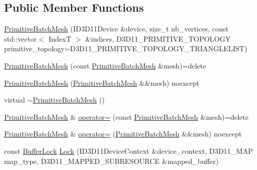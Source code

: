 \subsection*{Public Member Functions}
\begin{DoxyCompactItemize}
\item 
\mbox{\hyperlink{classmage_1_1rendering_1_1_primitive_batch_mesh_aa01b243a0ccb0ed4835c4dcab994d030}{Primitive\+Batch\+Mesh}} (I\+D3\+D11\+Device \&device, size\+\_\+t nb\+\_\+vertices, const std\+::vector$<$ IndexT $>$ \&indices, D3\+D11\+\_\+\+P\+R\+I\+M\+I\+T\+I\+V\+E\+\_\+\+T\+O\+P\+O\+L\+O\+GY primitive\+\_\+topology=D3\+D11\+\_\+\+P\+R\+I\+M\+I\+T\+I\+V\+E\+\_\+\+T\+O\+P\+O\+L\+O\+G\+Y\+\_\+\+T\+R\+I\+A\+N\+G\+L\+E\+L\+I\+ST)
\item 
\mbox{\hyperlink{classmage_1_1rendering_1_1_primitive_batch_mesh_a9f20b29914746fbb29b8c5146f7f63a2}{Primitive\+Batch\+Mesh}} (const \mbox{\hyperlink{classmage_1_1rendering_1_1_primitive_batch_mesh}{Primitive\+Batch\+Mesh}} \&mesh)=delete
\item 
\mbox{\hyperlink{classmage_1_1rendering_1_1_primitive_batch_mesh_ac46a8538b295cf4d85c7309d2bb4cdd5}{Primitive\+Batch\+Mesh}} (\mbox{\hyperlink{classmage_1_1rendering_1_1_primitive_batch_mesh}{Primitive\+Batch\+Mesh}} \&\&mesh) noexcept
\item 
virtual \mbox{\hyperlink{classmage_1_1rendering_1_1_primitive_batch_mesh_a96bb7d8ce20047163ec851b426087c80}{$\sim$\+Primitive\+Batch\+Mesh}} ()
\item 
\mbox{\hyperlink{classmage_1_1rendering_1_1_primitive_batch_mesh}{Primitive\+Batch\+Mesh}} \& \mbox{\hyperlink{classmage_1_1rendering_1_1_primitive_batch_mesh_a64b661150ec319d4dab092d44315bb67}{operator=}} (const \mbox{\hyperlink{classmage_1_1rendering_1_1_primitive_batch_mesh}{Primitive\+Batch\+Mesh}} \&mesh)=delete
\item 
\mbox{\hyperlink{classmage_1_1rendering_1_1_primitive_batch_mesh}{Primitive\+Batch\+Mesh}} \& \mbox{\hyperlink{classmage_1_1rendering_1_1_primitive_batch_mesh_a36409f6de1208f30069309675b19feb2}{operator=}} (\mbox{\hyperlink{classmage_1_1rendering_1_1_primitive_batch_mesh}{Primitive\+Batch\+Mesh}} \&\&mesh) noexcept
\item 
const \mbox{\hyperlink{classmage_1_1rendering_1_1_buffer_lock}{Buffer\+Lock}} \mbox{\hyperlink{classmage_1_1rendering_1_1_primitive_batch_mesh_afce7767a0e3496477c14f145c3c2bfe7}{Lock}} (I\+D3\+D11\+Device\+Context \&device\+\_\+context, D3\+D11\+\_\+\+M\+AP map\+\_\+type, D3\+D11\+\_\+\+M\+A\+P\+P\+E\+D\+\_\+\+S\+U\+B\+R\+E\+S\+O\+U\+R\+CE \&mapped\+\_\+buffer)
\end{DoxyCompactItemize}
